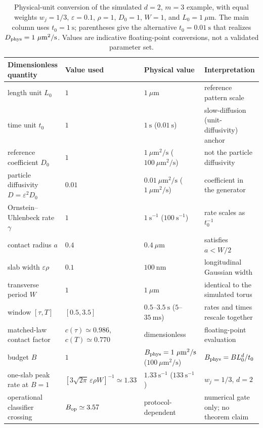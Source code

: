 \begin{table}[!t]
\caption{Physical-unit conversion of the simulated $d=2$, $m=3$ example,
with equal weights $w_j=1/3$, $\varepsilon=0.1$, $\rho=1$, $D_0=1$,
$W=1$, and $L_0=1~\mu\mathrm m$.  The main column uses $t_0=1~\mathrm s$;
parentheses give the alternative $t_0=0.01~\mathrm s$ that realizes
$D_{\rm phys}=1~\mu\mathrm m^2/\mathrm s$.  Values are indicative
floating-point conversions, not a validated parameter set.
\label{tab:units-mapping}}
\setlength{\tabcolsep}{1.4pt}
\begin{ruledtabular}
\begin{tabular}{@{}llll@{}}
Dimensionless quantity & Value used & Physical value & Interpretation\\
\hline
length unit $L_0$ & $1$ & $1~\mu\mathrm m$ & reference pattern scale\\
time unit $t_0$ & $1$ & $1~\mathrm s$ ($0.01~\mathrm s$) & slow-diffusion (unit-diffusivity) anchor\\
reference coefficient $D_0$ & $1$ & $1~\mu\mathrm m^2/\mathrm s$ ($100~\mu\mathrm m^2/\mathrm s$) & not the particle diffusivity\\
particle diffusivity $D=\varepsilon^2D_0$ & $0.01$ & $0.01~\mu\mathrm m^2/\mathrm s$ ($1~\mu\mathrm m^2/\mathrm s$) & coefficient in the generator\\
Ornstein--Uhlenbeck rate $\gamma$ & $1$ & $1~\mathrm s^{-1}$ ($100~\mathrm s^{-1}$) & rate scales as $t_0^{-1}$\\
contact radius $a$ & $0.4$ & $0.4~\mu\mathrm m$ & satisfies $a<W/2$\\
slab width $\varepsilon\rho$ & $0.1$ & $100~\mathrm{nm}$ & longitudinal Gaussian width\\
transverse period $W$ & $1$ & $1~\mu\mathrm m$ & identical to the simulated torus\\
window $[\tau,T]$ & $[0.5,3.5]$ & $0.5$--$3.5~\mathrm s$ ($5$--$35~\mathrm{ms}$) & rates and times rescale together\\
matched-law contact factor & $c(\tau)\simeq0.986$, $c(T)\simeq0.770$ & dimensionless & floating-point evaluation\\
budget $B$ & $1$ & $B_{\rm phys}=1~\mu\mathrm m^2/\mathrm s$ ($100~\mu\mathrm m^2/\mathrm s$) & $B_{\rm phys}=B L_0^d/t_0$\\
one-slab peak rate at $B=1$ & $[3\sqrt{2\pi}\,\varepsilon\rho W]^{-1}\simeq1.33$ & $1.33~\mathrm s^{-1}$ ($133~\mathrm s^{-1}$) & $w_j=1/3$, $d=2$\\
operational classifier crossing & $B_{\rm op}\simeq3.57$ & protocol-dependent & numerical gate only; no theorem claim\\
\end{tabular}
\end{ruledtabular}
\end{table}
